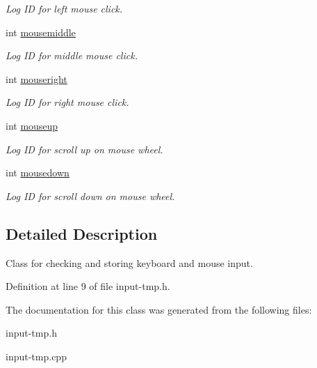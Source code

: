 \begin{DoxyCompactItemize}
\begin{DoxyCompactList}\small\item\em Log ID for left mouse click. \end{DoxyCompactList}\item 
int \hyperlink{classInput_aeada901dbf556cb13f81d8326943dd08}{mousemiddle}\hypertarget{classInput_aeada901dbf556cb13f81d8326943dd08}{}\label{classInput_aeada901dbf556cb13f81d8326943dd08}

\begin{DoxyCompactList}\small\item\em Log ID for middle mouse click. \end{DoxyCompactList}\item 
int \hyperlink{classInput_abbf0471b00d750ae25d638bca74be28f}{mouseright}\hypertarget{classInput_abbf0471b00d750ae25d638bca74be28f}{}\label{classInput_abbf0471b00d750ae25d638bca74be28f}

\begin{DoxyCompactList}\small\item\em Log ID for right mouse click. \end{DoxyCompactList}\item 
int \hyperlink{classInput_a66df7023e5db7300d0f9bcdafd140bf5}{mouseup}\hypertarget{classInput_a66df7023e5db7300d0f9bcdafd140bf5}{}\label{classInput_a66df7023e5db7300d0f9bcdafd140bf5}

\begin{DoxyCompactList}\small\item\em Log ID for scroll up on mouse wheel. \end{DoxyCompactList}\item 
int \hyperlink{classInput_a254eb8e3616257909a23449a7b87175e}{mousedown}\hypertarget{classInput_a254eb8e3616257909a23449a7b87175e}{}\label{classInput_a254eb8e3616257909a23449a7b87175e}

\begin{DoxyCompactList}\small\item\em Log ID for scroll down on mouse wheel. \end{DoxyCompactList}\end{DoxyCompactItemize}


\subsection{Detailed Description}
Class for checking and storing keyboard and mouse input. 

Definition at line 9 of file input-\/tmp.\+h.



The documentation for this class was generated from the following files\+:\begin{DoxyCompactItemize}
\item 
input-\/tmp.\+h\item 
input-\/tmp.\+cpp\end{DoxyCompactItemize}
